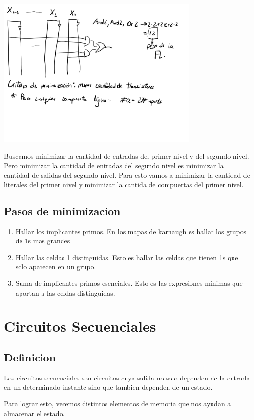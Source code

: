 \documentclass{report}
\begin{document}
\includegraphics[width=10cm]{../Assets/peso_fl.png}

Buscamos minimizar la cantidad de entradas del primer nivel y del segundo nivel.
Pero minimizar la cantidad de entradas del segundo nivel es minimizar la cantidad de salidas del segundo nivel.
Para esto vamos a minimizar la cantidad de literales del primer nivel y minimizar la cantida de compuertas del primer nivel.

\section{Pasos de minimizacion}

\begin{enumerate}
	\item Hallar los implicantes primos. En los mapas de karnaugh es hallar los grupos de 1s mas grandes
	\item Hallar las celdas 1 distinguidas. Esto es hallar las celdas que tienen 1s que solo aparecen en un grupo.
	\item Suma de implicantes primos esenciales. Esto es las expresiones minimas que aportan a las celdas distinguidas.
\end{enumerate}

\chapter{Circuitos Secuenciales}
\section{Definicion}
Los circuitos secuenciales son circuitos cuya salida no solo dependen de la entrada en un determinado instante sino que tambien dependen de un estado.

Para lograr esto, veremos distintos elementos de memoria que nos ayudan a almacenar el estado.
\end{document}
